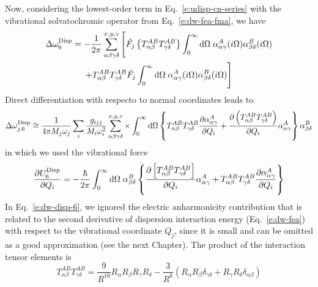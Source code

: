 \documentclass[a4paper,titlepage,twoside,fleqn,12pt]{book}
\newcommand{\fderiv}[2]{\ensuremath{
\frac{\partial #1}{\partial #2}}}
\begin{document}
\begin{refsection}
Now, considering the lowest\hyp{}order term in Eq.~\eqref{e:udisp-cn-series} 
with the vibrational solvatochromic operator from Eq.~\eqref{e:dw-fea-fma}, we have
%
\begin{multline}
   \Delta\omega^{\rm Disp}_6 = - \frac{1}{2\pi} \sum_{\alpha\beta\gamma\delta}^{x,y,z} 
   \Bigg[ 
   \hat{F_j} \left\{ T^{AB}_{\alpha\beta}T^{AB}_{\gamma\delta} \right\} \int_0^{\infty} {\rm d}\Omega \; 
    \alpha^A_{\alpha\gamma}(i\Omega)\alpha^B_{\beta\delta}(i\Omega) \\
   + 
   T^{AB}_{\alpha\beta}T^{AB}_{\gamma\delta} \hat{F_j} \int_0^{\infty} {\rm d}\Omega \;
   \alpha^A_{\alpha\gamma}(i\Omega)\alpha^B_{\beta\delta}(i\Omega) 
   \Bigg]
\end{multline}
%
Direct differentiation with respecto to normal coordinates leads to 
%
\begin{equation} \label{e:dw-disp-6}
 \Delta\omega_{j,6}^{\rm Disp} \cong 
\frac{1}{4\pi M_j\omega_j}\sum_i \frac{g_{ijj}}{M_i\omega_i^2} 
\sum_{\alpha\beta\gamma\delta}^{x,y,z}   \times \int_{0}^{\infty} {\rm d}\Omega
%
 \left\{
T^{AB}_{\alpha\beta}T^{AB}_{\gamma\delta}
\frac{\partial \alpha_{\alpha\gamma}^{A}}{\partial Q_i}
+
\frac{\partial \left(T^{AB}_{\alpha\beta}T^{AB}_{\gamma\delta}\right)}{\partial Q_i}
\alpha_{\alpha\gamma}^{A}
\right\}
\alpha_{\beta\delta}^{B}
\end{equation}
%
in which we used the vibrational force 
%
\begin{equation} \label{e:vibr-force-disp-6}
 \fderiv{U^{\rm Disp}_6}{Q_i} = -\frac{\hbar}{2\pi} \int_0^\infty {\rm d}\Omega \;
 \alpha^B_{\beta\delta}
 \left\{
     \fderiv{\left[T^{AB}_{\alpha\beta}T^{AB}_{\gamma\delta}\right]}{Q_i} 
         \alpha^A_{\alpha\gamma}
      + 
     T^{AB}_{\alpha\beta}T^{AB}_{\gamma\delta} \fderiv{\alpha^A_{\alpha\gamma}}{Q_i}
 \right\}
\end{equation}
%
In Eq.~\eqref{e:dw-disp-6}, we ignored the electric anharmonicity contribution 
that is related to the second derivative of dispersion interaction energy 
(Eq.~\eqref{e:dw-fea}) with respect to the vibrational coordinate $Q_j$, 
since it is small and can be omitted as a good approximation 
(see the next Chapter). 
The product of the interaction tensor elements is
%
\begin{equation} \label{e:378463267}
 T^{AB}_{\alpha\beta} T^{AB}_{\gamma\delta} = \frac{9}{R^{10}} R_\alpha R_\beta R_\gamma R_\delta
 - \frac{3}{R^8} \left( R_\alpha R_\beta \delta_{\gamma\delta} + R_\gamma R_\delta \delta_{\alpha\beta}\right)

\end{equation}
\end{refsection}
\end{document}
